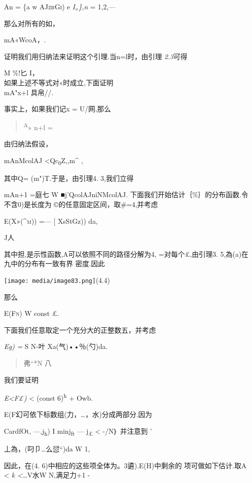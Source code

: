 \documentclass{article}
\begin{document}
An = \{a w \textsc{AJzrGi)} e \emph{I„\},n} = 1,2,---

那么对所有的如，

mA«Wco\textbar{}A，\textbar{}.

证明我们用归纳法来证明这个引理.当n=l时，由引理 \emph{2.3}可得

M \%!匕 I，\\
如果上述不等式对«时成立,下面证明\\
mA"x+l 具帛//.

事实上，如果我们记x = U/网,那么

\begin{quote}
\textsuperscript{A}» n+l =
\end{quote}

由归纳法假设，

mAnMcolAJ \textless{}Qc\textsubscript{0}\textbar{}Z,,\textbar{}m\^{} ,

其中Q= (m")T.于是，由引理4. 3,我们立得

mAn+1 =庭七 W ■j'QcolAJniNMcolAJ. \textbar{}
下面我们开始估计｛\%｝的分布函数.令不含0)是长度为
©的任意固定区间，取\#=4,并考虑

\textsc{E(X»(\^{}m))} =--- {[} XsStGz)) da,

J人

其中担,是示性函数,A可以依照不同的路径分解为4, =对每个£,由引理3.
5,為(a)在九中的分布有一致有界 密度.因此

\texttt{[image: media/image83.png]}(4.4)

那么

\textsc{E(Fn)} W const £.

下面我们任意取定一个充分大的正整数五，并考虑

\emph{Eg) =} S N-叶 Xa(气)••％(勺)da.

\begin{quote}
弗``*N 八
\end{quote}

我们要证明

\emph{E\textless{}F£)} \textless{} (const 6)\textsuperscript{h} + Owb.

E(F幻可依下标数组(力，\ldots{}，水)分成两部分.因为

CardfOt, ---,j\textsubscript{h}) I min\textbar{}j\textsubscript{ft} ---
j\textsubscript{£}\textbar{} \textless{} -/N｝ 并注意到 '

丄為，(叼卩\ldots{}么愆``)da W 1,

因此，在(4. 6)中相应的这些项全体为。3遴).E(H)中剩余的 项可做如下估计.取A
\textless{} \emph{k \textless{}}\ldots{}V水W N,满足力+1 -
\end{document}
